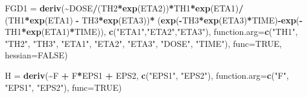 \documentclass[
  11pt,
  krantz2, a4paper, twoside]{krantz}
\newenvironment{Shaded}{\begin{snugshade}}{\end{snugshade}}
\newcommand{\DataTypeTok}[1]{\textcolor[rgb]{0.13,0.29,0.53}{#1}}
\newcommand{\KeywordTok}[1]{\textcolor[rgb]{0.13,0.29,0.53}{\textbf{#1}}}
\newcommand{\NormalTok}[1]{#1}
\newcommand{\OperatorTok}[1]{\textcolor[rgb]{0.81,0.36,0.00}{\textbf{#1}}}
\newcommand{\OtherTok}[1]{\textcolor[rgb]{0.56,0.35,0.01}{#1}}
\newcommand{\StringTok}[1]{\textcolor[rgb]{0.31,0.60,0.02}{#1}}
\theoremstyle{definition}
\theoremstyle{definition}
\theoremstyle{definition}
\theoremstyle{remark}
\begin{document}
\begin{Shaded}
\begin{Highlighting}[]
\NormalTok{FGD1 =}\StringTok{ }\KeywordTok{deriv}\NormalTok{(}\OperatorTok{\textasciitilde{}}\NormalTok{DOSE}\OperatorTok{/}\NormalTok{(TH2}\OperatorTok{*}\KeywordTok{exp}\NormalTok{(ETA2))}\OperatorTok{*}\NormalTok{TH1}\OperatorTok{*}\KeywordTok{exp}\NormalTok{(ETA1)}\OperatorTok{/}
\StringTok{             }\NormalTok{(TH1}\OperatorTok{*}\KeywordTok{exp}\NormalTok{(ETA1) }\OperatorTok{{-}}\StringTok{ }\NormalTok{TH3}\OperatorTok{*}\KeywordTok{exp}\NormalTok{(ETA3))}\OperatorTok{*}
\NormalTok{			 (}\KeywordTok{exp}\NormalTok{(}\OperatorTok{{-}}\NormalTok{TH3}\OperatorTok{*}\KeywordTok{exp}\NormalTok{(ETA3)}\OperatorTok{*}\NormalTok{TIME)}\OperatorTok{{-}}\KeywordTok{exp}\NormalTok{(}\OperatorTok{{-}}\NormalTok{TH1}\OperatorTok{*}\KeywordTok{exp}\NormalTok{(ETA1)}\OperatorTok{*}\NormalTok{TIME)),}
             \KeywordTok{c}\NormalTok{(}\StringTok{"ETA1"}\NormalTok{,}\StringTok{"ETA2"}\NormalTok{,}\StringTok{"ETA3"}\NormalTok{),}
             \DataTypeTok{function.arg=}\KeywordTok{c}\NormalTok{(}\StringTok{"TH1"}\NormalTok{, }\StringTok{"TH2"}\NormalTok{, }\StringTok{"TH3"}\NormalTok{, }\StringTok{"ETA1"}\NormalTok{, }\StringTok{"ETA2"}\NormalTok{, }\StringTok{"ETA3"}\NormalTok{, }
			                \StringTok{"DOSE"}\NormalTok{, }\StringTok{"TIME"}\NormalTok{),}
             \DataTypeTok{func=}\OtherTok{TRUE}\NormalTok{, }\DataTypeTok{hessian=}\OtherTok{FALSE}\NormalTok{)}

\NormalTok{H =}\StringTok{ }\KeywordTok{deriv}\NormalTok{(}\OperatorTok{\textasciitilde{}}\NormalTok{F }\OperatorTok{+}\StringTok{ }\NormalTok{F}\OperatorTok{*}\NormalTok{EPS1 }\OperatorTok{+}\StringTok{ }\NormalTok{EPS2, }\KeywordTok{c}\NormalTok{(}\StringTok{"EPS1"}\NormalTok{, }\StringTok{"EPS2"}\NormalTok{), }
          \DataTypeTok{function.arg=}\KeywordTok{c}\NormalTok{(}\StringTok{"F"}\NormalTok{, }\StringTok{"EPS1"}\NormalTok{, }\StringTok{"EPS2"}\NormalTok{), }
          \DataTypeTok{func=}\OtherTok{TRUE}\NormalTok{)}


\end{Highlighting}
\end{Shaded}
\end{document}
